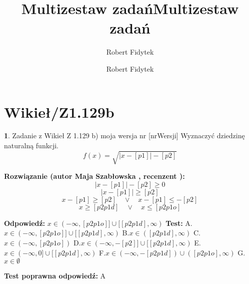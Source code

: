 \documentclass[12pt, a4paper]{article}
\title{Multizestaw zadań}
\author{Robert Fidytek}
\date{}\documentclass[12pt, a4paper]{article}
\title{Multizestaw zadań}
\author{Robert Fidytek}
\date{}
\theoremstyle{definition} %
\newtheorem{zad}{}
\theoremstyle{definition} %
\newtheorem{zad}{}
\newcommand{\kategoria}[1]{\section{#1}} %
\newcommand{\zadStart}[1]{\begin{zad}#1\newline} %
\newcommand{\zadStop}{\end{zad}}   %
\newcommand{\rozwStart}[2]{\noindent \textbf{Rozwiązanie (autor #1 , recenzent #2): }\newline} %
\newcommand{\rozwStop}{\newline}                                            %
\newcommand{\odpStart}{\noindent \textbf{Odpowiedź:}\newline}    %
\newcommand{\odpStop}{\newline}                                             %
\newcommand{\testStart}{\noindent \textbf{Test:}\newline} %
\newcommand{\testStop}{\newline} %
\newcommand{\kluczStart}{\noindent \textbf{Test poprawna odpowiedź:}\newline} %
\newcommand{\kluczStop}{\newline} %
\begin{document}
\maketitle


\kategoria{Wikieł/Z1.129b}
\zadStart{Zadanie z Wikieł Z 1.129 b) moja wersja nr [nrWersji]}
Wyznaczyć dziedzinę naturalną funkcji.
$$f(x)=\sqrt{|x-[p1]|-[p2]}$$
\zadStop

\rozwStart{Maja Szabłowska}{}
$$|x-[p1]|-[p2]\geq 0$$
$$|x-[p1]|\geq [p2]$$
$$x-[p1]\geq[p2] \quad \lor \quad x-[p1]\leq-[p2]$$
$$x\geq[p2p1d] \quad \lor \quad x\leq[p2p1o] $$

\rozwStop
\odpStart
$x\in(-\infty, [p2p1o]] \cup [[p2p1d],\infty)$
\odpStop
\testStart
A.$x\in(-\infty, [p2p1o]] \cup [[p2p1d],\infty)$
B.$x\in([p2p1d],\infty)$
C.$x\in(-\infty, [p2p1o])$
D.$x\in(-\infty, -[p2]] \cup [[p2p1d],\infty)$
E.$x\in(-\infty, 0] \cup [[p2p1d],\infty)$
F.$x\in(-\infty, -[p2p1d]) \cup ([p2p1o],\infty)$
G.$x\in\emptyset$

\testStop
\kluczStart
A
\kluczStop
\end{document}
